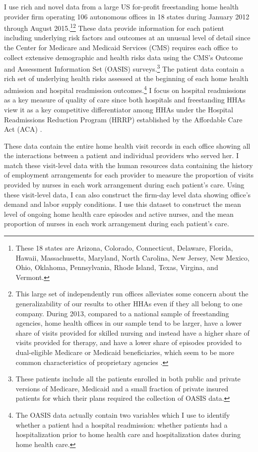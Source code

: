 \documentclass[final,12pt]{article}
\begin{document}
I use rich and novel data from a large US for-profit freestanding home health provider firm operating 106 autonomous offices in 18 states during January 2012 through August 2015.\footnote{
These 18 states are Arizona, Colorado, Connecticut, Delaware, Florida, Hawaii, Massachusetts, Maryland, North Carolina, New Jersey, New Mexico, Ohio, Oklahoma, Pennsylvania, Rhode Island, Texas, Virgina, and Vermont.}\footnote{This large set of independently run offices alleviates some concern about the generalizability of our results to other HHAs even if they all belong to one company. During 2013, compared to a national sample of freestanding agencies, home health offices in our sample tend to be larger, have a lower share of visits provided for skilled nursing and instead have a higher share of visits provided for therapy, and have a lower share of episodes provided to dual-eligible Medicare or Medicaid beneficiaries, which seem to be more common characteristics of proprietary agencies \citep{Cabin2014, MedPAC2016hh}.}
These data provide information for each patient including underlying risk factors and outcomes at an unusual level of detail since the Center for Medicare and Medicaid Services (CMS) requires each office to collect extensive demographic and health risks data using the CMS's Outcome and Assessment Information Set (OASIS) surveys.\footnote{These patients include all the patients enrolled in both public and private versions of Medicare, Medicaid and a small fraction of private insured patients for which their plans required the collection of OASIS data.}
The patient data contain a rich set of underlying health risks assessed at the beginning of each home health admission and hospital readmission outcomes.\footnote{The OASIS data actually contain two variables which I use to identify whether a patient had a hospital readmission: whether patients had a hospitalization prior to home health care and hospitalization dates during home health care.}
I focus on hospital readmissions as a key measure of quality of care since both hospitals and freestanding HHAs view it as a key competitive differentiator among HHAs under the Hospital Readmissions Reduction Program (HRRP) established by the Affordable Care Act (ACA) \citep{Worth2014}.

These data contain the entire home health visit records in each office showing all the interactions between a patient and individual providers who served her.
I match these visit-level data with the human resources data containing the history of employment arrangements for each provider to measure the proportion of visits provided by nurses in each work arrangement during each patient's care.
Using these visit-level data, I can also construct the firm-day level data showing office's demand and labor supply conditions. I use this dataset to construct the mean level of ongoing home health care episodes and active nurses, and the mean proportion of nurses in each work arrangement during each patient's care.
\end{document}
